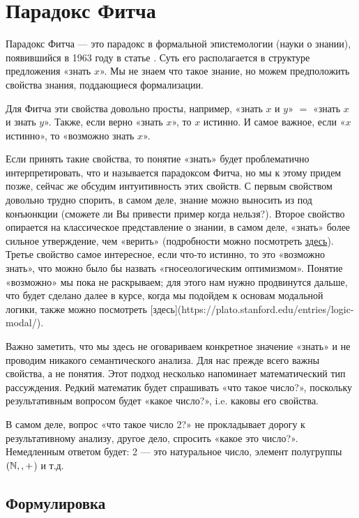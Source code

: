 \documentclass[openany]{book}
\theoremstyle{plain}
\theoremstyle{definition}
\begin{document}
\section{ Парадокс Фитча }

Парадокс Фитча — это парадокс в формальной эпистемологии (науки о знании), появившийся в 1963 году в статье \cite{Fitch}. Суть его располагается в структуре предложения «знать \(x\)». Мы не знаем что такое знание, но можем предположить свойства знания, поддающиеся формализации.

Для Фитча эти свойства довольно просты, например, «знать \(x\) и \(y\)» \(=\) «знать \(x\) и знать \(y\)». Также, если верно «знать \(x\)», то \(x\) истинно. И самое важное, если «\(x\) истинно», то «возможно знать \(x\)».

Если принять такие свойства, то понятие «знать» будет проблематично интерпретировать, что и называется парадоксом Фитча, но мы к этому придем позже, сейчас же обсудим интуитивность этих свойств. С первым свойством довольно трудно спорить, в самом деле, знание можно выносить из под конъюнкции (сможете ли Вы привести пример когда нельзя?). Второе свойство опирается на классическое представление о знании, в самом деле, «знать» более сильное утверждение, чем «верить» (подробности можно посмотреть \href{https://plato.stanford.edu/entries/knowledge-analysis/}{здесь}). Третье свойство самое интересное, если что-то истинно, то это «возможно знать», что можно было бы назвать «гносеологическим оптимизмом». Понятие «возможно» мы пока не раскрываем; для этого нам нужно продвинутся дальше, что будет сделано далее в курсе, когда мы подойдем к основам модальной логики, также можно посмотреть [здесь](https://plato.stanford.edu/entries/logic-modal/).

Важно заметить, что мы здесь не оговариваем конкретное значение «знать» и не проводим никакого семантического анализа. Для нас прежде всего важны свойства, а не понятия. Этот подход несколько напоминает математический тип рассуждения. Редкий математик будет спрашивать «что такое число?», поскольку результативным вопросом будет «какое число?», i.e. каковы его свойства.

В самом деле, вопрос «что такое число 2?» не прокладывает дорогу к результативному анализу, другое дело, спросить «какое это число?». Немедленным ответом будет: 2 — это натуральное число, элемент полугруппы \((\mathbb{N}, \\, +\)) и т.д.

\subsection{ Формулировка }
\end{document}
